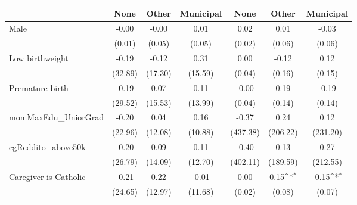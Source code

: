 {
\def\sym#1{\ifmmode^{#1}\else\(^{#1}\)\fi}
\begin{tabular}{l*{6}{c}}
\toprule
                    &\multicolumn{1}{c}{None}&\multicolumn{1}{c}{Other}&\multicolumn{1}{c}{Municipal}&\multicolumn{1}{c}{None}&\multicolumn{1}{c}{Other}&\multicolumn{1}{c}{Municipal}\\
\midrule
Male                &       -0.00         &       -0.00         &        0.01         &        0.02         &        0.01         &       -0.03         \\
                    &      (0.01)         &      (0.05)         &      (0.05)         &      (0.02)         &      (0.06)         &      (0.06)         \\
\addlinespace
Low birthweight     &       -0.19         &       -0.12         &        0.31         &        0.00         &       -0.12         &        0.12         \\
                    &     (32.89)         &     (17.30)         &     (15.59)         &      (0.04)         &      (0.16)         &      (0.15)         \\
\addlinespace
Premature birth     &       -0.19         &        0.07         &        0.11         &       -0.00         &        0.19         &       -0.19         \\
                    &     (29.52)         &     (15.53)         &     (13.99)         &      (0.04)         &      (0.14)         &      (0.14)         \\
\addlinespace
momMaxEdu\_UniorGrad &       -0.20         &        0.04         &        0.16         &       -0.37         &        0.24         &        0.12         \\
                    &     (22.96)         &     (12.08)         &     (10.88)         &    (437.38)         &    (206.22)         &    (231.20)         \\
\addlinespace
cgReddito\_above50k  &       -0.20         &        0.09         &        0.11         &       -0.40         &        0.13         &        0.27         \\
                    &     (26.79)         &     (14.09)         &     (12.70)         &    (402.11)         &    (189.59)         &    (212.55)         \\
\addlinespace
Caregiver is Catholic&       -0.21         &        0.22         &       -0.01         &        0.00         &        0.15\sym{*}  &       -0.15\sym{*}  \\
                    &     (24.65)         &     (12.97)         &     (11.68)         &      (0.02)         &      (0.08)         &      (0.07)         \\

\end{tabular}}
